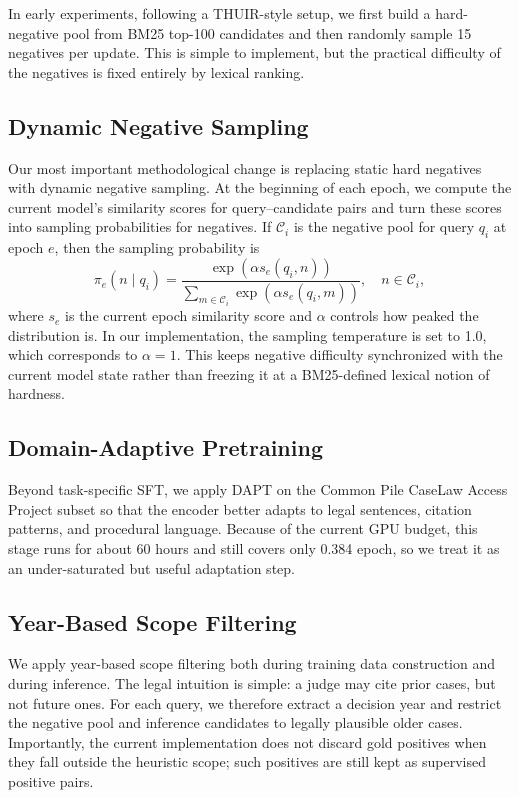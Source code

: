 In early experiments, following a THUIR-style setup, we first build a hard-negative pool from BM25 top-100 candidates and then randomly sample 15 negatives per update. This is simple to implement, but the practical difficulty of the negatives is fixed entirely by lexical ranking.

\subsection{Dynamic Negative Sampling}

Our most important methodological change is replacing static hard negatives with dynamic negative sampling. At the beginning of each epoch, we compute the current model's similarity scores for query--candidate pairs and turn these scores into sampling probabilities for negatives. If $\mathcal{C}_i$ is the negative pool for query $q_i$ at epoch $e$, then the sampling probability is
\begin{equation}
\pi_e(n \mid q_i)=
\frac{\exp\left(\alpha s_e(q_i,n)\right)}
{\sum_{m \in \mathcal{C}_i}\exp\left(\alpha s_e(q_i,m)\right)},
\quad n \in \mathcal{C}_i,
\end{equation}
where $s_e$ is the current epoch similarity score and $\alpha$ controls how peaked the distribution is. In our implementation, the sampling temperature is set to 1.0, which corresponds to $\alpha=1$.
This keeps negative difficulty synchronized with the current model state rather than freezing it at a BM25-defined lexical notion of hardness.

\subsection{Domain-Adaptive Pretraining}

Beyond task-specific SFT, we apply DAPT on the Common Pile CaseLaw Access Project subset so that the encoder better adapts to legal sentences, citation patterns, and procedural language. Because of the current GPU budget, this stage runs for about 60 hours and still covers only 0.384 epoch, so we treat it as an under-saturated but useful adaptation step.

\subsection{Year-Based Scope Filtering}

We apply year-based scope filtering both during training data construction and during inference. The legal intuition is simple: a judge may cite prior cases, but not future ones. For each query, we therefore extract a decision year and restrict the negative pool and inference candidates to legally plausible older cases. Importantly, the current implementation does not discard gold positives when they fall outside the heuristic scope; such positives are still kept as supervised positive pairs.

